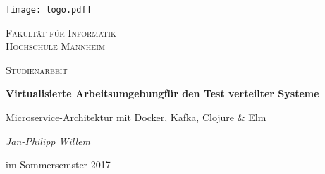 \begin{titlepage}
{\texttt{[image: logo.pdf]}}\par
\vspace{4cm}
\centering
{\scshape\LARGE Fakultät für Informatik \\ Hochschule Mannheim\par}
\vspace{1cm}
{\scshape\Large Studienarbeit\par}
\vspace{.5cm}
{\huge\bfseries Virtualisierte Arbeitsumgebung\break für den Test verteilter Systeme\par}
{\LARGE Microservice-Architektur mit Docker, Kafka, Clojure \& Elm\par}
\vspace{1cm}
{\Large\itshape Jan-Philipp Willem\par}
\vspace{.5cm}
{\Large im Sommersemster 2017}
\vfill
\end{titlepage}
